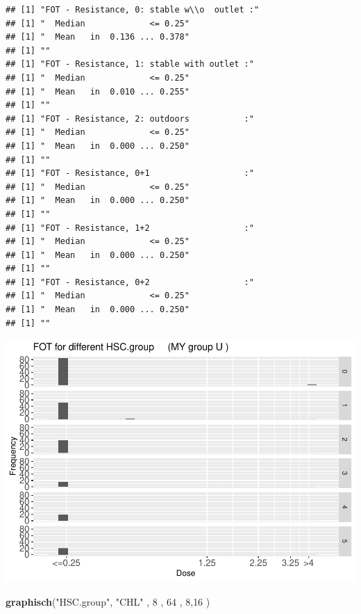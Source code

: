 \documentclass[
]{article}
\newenvironment{Shaded}{\begin{snugshade}}{\end{snugshade}}
\newcommand{\DecValTok}[1]{\textcolor[rgb]{0.00,0.00,0.81}{#1}}
\newcommand{\KeywordTok}[1]{\textcolor[rgb]{0.13,0.29,0.53}{\textbf{#1}}}
\newcommand{\NormalTok}[1]{#1}
\newcommand{\StringTok}[1]{\textcolor[rgb]{0.31,0.60,0.02}{#1}}
\begin{document}
\begin{verbatim}
## [1] "FOT - Resistance, 0: stable w\\o  outlet :"
## [1] "  Median             <= 0.25"
## [1] "  Mean   in  0.136 ... 0.378"
## [1] ""
## [1] "FOT - Resistance, 1: stable with outlet :"
## [1] "  Median             <= 0.25"
## [1] "  Mean   in  0.010 ... 0.255"
## [1] ""
## [1] "FOT - Resistance, 2: outdoors           :"
## [1] "  Median             <= 0.25"
## [1] "  Mean   in  0.000 ... 0.250"
## [1] ""
## [1] "FOT - Resistance, 0+1                   :"
## [1] "  Median             <= 0.25"
## [1] "  Mean   in  0.000 ... 0.250"
## [1] ""
## [1] "FOT - Resistance, 1+2                   :"
## [1] "  Median             <= 0.25"
## [1] "  Mean   in  0.000 ... 0.250"
## [1] ""
## [1] "FOT - Resistance, 0+2                   :"
## [1] "  Median             <= 0.25"
## [1] "  Mean   in  0.000 ... 0.250"
## [1] ""
\end{verbatim}

\includegraphics{Verteilungen_files/figure-latex/unnamed-chunk-51-1.pdf}

\begin{Shaded}
\begin{Highlighting}[]
   \KeywordTok{graphisch}\NormalTok{(}\StringTok{"HSC.group"}\NormalTok{, }\StringTok{"CHL"}\NormalTok{ , }\DecValTok{8}\NormalTok{    ,  }\DecValTok{64}\NormalTok{   ,   }\DecValTok{8}\NormalTok{,}\DecValTok{16}\NormalTok{   ) }
\end{Highlighting}
\end{Shaded}
\end{document}
